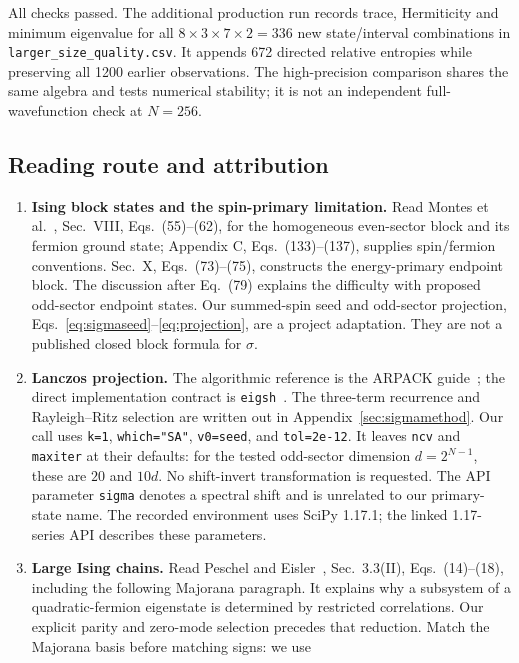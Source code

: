 All checks passed. The additional production run records trace,
Hermiticity and minimum eigenvalue for all $8\times3\times7\times2=336$
new state/interval combinations in \texttt{larger\_size\_quality.csv}.
It appends 672 directed relative entropies while preserving all 1200
earlier observations. The high-precision comparison shares the same
algebra and tests numerical stability; it is not an independent
full-wavefunction check at $N=256$.

\subsection{Reading route and attribution}
\begin{enumerate}
\item \textbf{Ising block states and the spin-primary limitation.}
Read Montes et al.~\cite{Montes2017}, Sec.~VIII, Eqs.~(55)--(62),
for the homogeneous even-sector block and its fermion ground state;
Appendix C, Eqs.~(133)--(137), supplies spin/fermion conventions.
Sec.~X, Eqs.~(73)--(75), constructs the energy-primary endpoint block.
The discussion after Eq.~(79) explains the difficulty with proposed
odd-sector endpoint states. Our summed-spin seed and odd-sector
projection, Eqs.~\eqref{eq:sigmaseed}--\eqref{eq:projection}, are a
project adaptation. They are not a published closed block formula for
$\sigma$.
\item \textbf{Lanczos projection.}
The algorithmic reference is the ARPACK guide~\cite{ARPACK}; the
direct implementation contract is \texttt{eigsh}~\cite{ScipyEigsh}.
The three-term recurrence and Rayleigh--Ritz selection are written out
in Appendix~\ref{sec:sigmamethod}. Our call uses \texttt{k=1},
\texttt{which="SA"}, \texttt{v0=seed}, and \texttt{tol=2e-12}.
It leaves \texttt{ncv} and \texttt{maxiter} at their defaults: for the
tested odd-sector dimension $d=2^{N-1}$, these are $20$ and $10d$.
No shift-invert transformation is requested. The API parameter
\texttt{sigma} denotes a spectral shift and is unrelated to our
primary-state name. The recorded environment uses SciPy 1.17.1;
the linked 1.17-series API describes these parameters.
\item \textbf{Large Ising chains.}
Read Peschel and Eisler~\cite{PeschelEisler}, Sec.~3.3(II),
Eqs.~(14)--(18), including the following Majorana paragraph.
It explains why a subsystem of a quadratic-fermion eigenstate is
determined by restricted correlations. Our explicit parity and zero-mode
selection precedes that reduction. Match the Majorana basis before
matching signs: we use

\end{enumerate}
